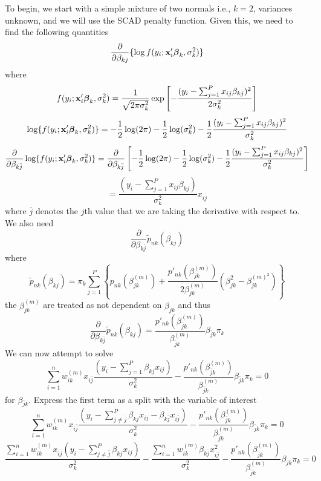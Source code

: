 \documentclass{article}
\newcommand{\bx}{{\bf{x}}}                                                 %
\newcommand{\bbeta}{{\boldsymbol \beta}}                        %
\begin{document}
To begin, we start with a simple mixture of two normals i.e., $k = 2$, variances unknown, and we will use the SCAD
penalty function. Given this, we need to find the following quantities
    $$ \frac{\partial}{\partial \beta_{kj}}\{ \log f(y_i; \bx_i'\bbeta_k, \sigma^2_k) \}$$
where 
    $$f(y_i; \bx_i' \bbeta_k, \sigma^2_k) = \frac{1} {\sqrt{2\pi\sigma_k^2} } 
         \exp \left[  -\frac{(y_i - \sum_{j=1}^P x_{ij}\beta_{kj})^2} {2\sigma^2_k}                   \right ]$$
    $$\log \{ f(y_i; \bx_i' \bbeta_k, \sigma^2_k) \} = -\frac{1}{2} \log(2\pi) - \frac{1}{2} \log(\sigma^2_k) -
           \frac{1}{2}\frac{(y_i - \sum_{j=1}^P x_{ij}\beta_{kj})^2} {\sigma^2_k}                  $$      
    $$\frac{\partial}{\partial \beta_{k{\bar j}}}\log \{ f(y_i; \bx_i' \bbeta_k, \sigma^2_k) \} = 
          \frac{\partial}{\partial \beta_{k{\bar j}}}\left [ -\frac{1}{2} \log(2\pi) - \frac{1}{2} \log(\sigma^2_k) -
           \frac{1}{2}\frac{(y_i - \sum_{j=1}^P x_{ij}\beta_{kj})^2} {\sigma^2_k}    \right ]             $$
     $$ = \frac{(y_i - \sum_{j=1}^P x_{ij}\beta_{kj})} {\sigma^2_k} x_{i{\bar j}}              $$
where ${\bar j}$ denotes the $j$th value that we are taking the derivative with respect to. We also need 
     $$ \frac{\partial}{\partial \beta_{k{\bar j}}}{\tilde p_{nk}}(\beta_{kj})$$
where 
    $${\tilde p_{nk}}(\beta_{kj}) = \pi_k\sum_{j=1}^P\left \{ p_{nk}(\beta^{(m)}_{jk}) + 
                                                   \frac{ p'_{nk}(\beta^{(m)}_{jk}) } { 2\beta_{jk}^{(m)} }(\beta_{jk}^2 
                                                   -  \beta_{jk}^{(m)^2})  \right \}$$
the $\beta^{(m)}_{jk}$ are treated as not dependent on $\beta_{jk}$ and thus 
    $$ \frac{\partial}{\partial \beta_{k{\bar j}}}{\tilde p_{nk}}(\beta_{kj}) = 
         \frac{ p'_{nk}(\beta^{(m)}_{{\bar j}k}) } { \beta_{{\bar j}k}^{(m)} }\beta_{{\bar j}k}\pi_k  $$
We can now attempt to solve
    $$ \sum_{i=1}^nw_{ik}^{(m)} x_{i{\bar j}}\frac{(y_i - \sum_{j=1}^P\beta_{kj}x_{ij})} {\sigma^2_k}    - 
         \frac{ p'_{nk}(\beta^{(m)}_{{\bar j}k}) } { \beta_{{\bar j}k}^{(m)} }\beta_{{\bar j}k}\pi_k = 0$$
for $\beta_{{\bar j}k}$. Express the first term as a split with the variable of interest
    $$ \sum_{i=1}^nw_{ik}^{(m)} x_{i{\bar j}}\frac{(y_i - \sum_{j\neq{\bar j}}^P\beta_{kj}x_{ij} - 
      \beta_{k{\bar j}}x_{i{\bar j}})}    
      {\sigma^2_k}  - \frac{ p'_{nk}(\beta^{(m)}_{{\bar j}k}) } { \beta_{{\bar j}k}^{(m)} }\beta_{{\bar j}k}\pi_k = 0$$
    $$ \frac{\sum_{i=1}^nw_{ik}^{(m)} x_{i{\bar j}}(y_i - 
         \sum_{j\neq{\bar j}}^P\beta_{kj}x_{ij})} {\sigma^2_k} - 
         \frac{\sum_{i=1}^nw_{ik}^{(m)}\beta_{k{\bar j}}x^2_{i{\bar j}}}    
        {\sigma^2_k}  - \frac{ p'_{nk}(\beta^{(m)}_{{\bar j}k}) } { \beta_{{\bar j}k}^{(m)} }\beta_{{\bar j}k}\pi_k = 0$$
\end{document}
